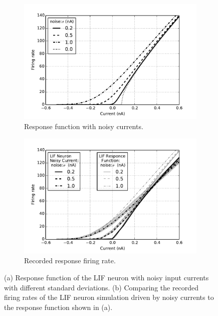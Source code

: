	\begin{figure}[bt!]
		\centering
		\begin{subfigure}[t]{0.4\textwidth}
			\includegraphics[width=\textwidth]{pics_iconip/1.pdf}
		    \caption{Response function with noisy currents.}
		    \label{Fig:physics}
		\end{subfigure}
		\begin{subfigure}[t]{0.4\textwidth}
			\includegraphics[width=\textwidth]{pics_iconip/2.pdf}
		    \caption{Recorded response firing rate.}
		    \label{Fig:lif_curr}
		\end{subfigure}
		\caption{
			(a) Response function of the LIF neuron with noisy input currents with different standard deviations.
			(b) Comparing the recorded firing rates of the LIF neuron simulation driven by noisy currents to the response function shown in (a). }
		\label{fig:firefunc}	
	\end{figure}
